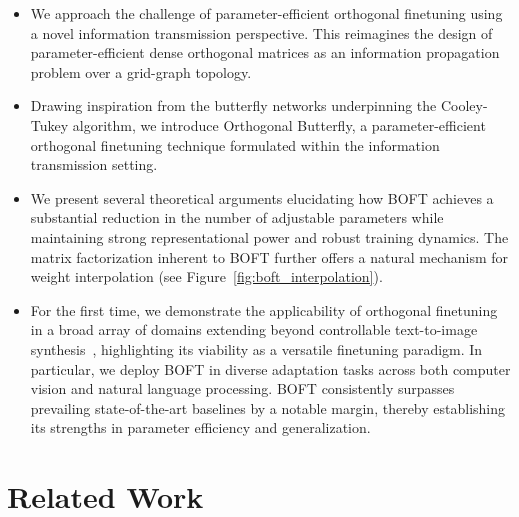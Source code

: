 \begin{itemize}[leftmargin=*,nosep]
    \item We approach the challenge of parameter-efficient orthogonal finetuning using a novel information transmission perspective. This reimagines the design of parameter-efficient dense orthogonal matrices as an information propagation problem over a grid-graph topology.
    \item Drawing inspiration from the butterfly networks underpinning the Cooley-Tukey algorithm, we introduce Orthogonal Butterfly, a parameter-efficient orthogonal finetuning technique formulated within the information transmission setting.
    \item We present several theoretical arguments elucidating how BOFT achieves a substantial reduction in the number of adjustable parameters while maintaining strong representational power and robust training dynamics. The matrix factorization inherent to BOFT further offers a natural mechanism for weight interpolation (see Figure~\ref{fig:boft_interpolation}).
    \item For the first time, we demonstrate the applicability of orthogonal finetuning in a broad array of domains extending beyond controllable text-to-image synthesis~\cite{qiu2023controlling}, highlighting its viability as a versatile finetuning paradigm. In particular, we deploy BOFT in diverse adaptation tasks across both computer vision and natural language processing. BOFT consistently surpasses prevailing state-of-the-art baselines by a notable margin, thereby establishing its strengths in parameter efficiency and generalization.
\end{itemize}

\section{Related Work}

